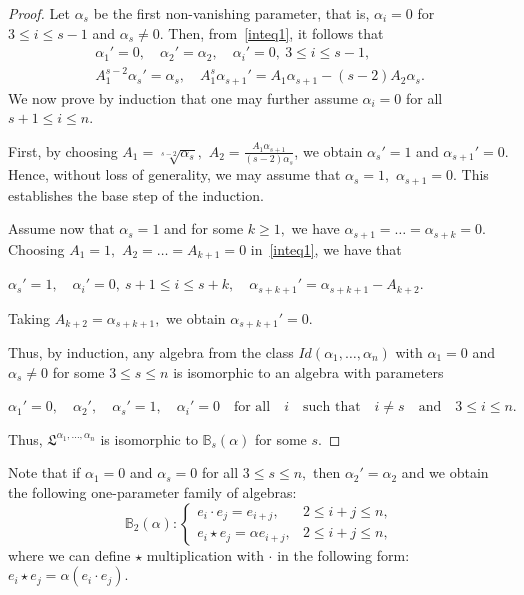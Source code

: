 \documentclass{jonasart}
\begin{document}
	\begin{proof}
		Let $\alpha_s$ be the first non-vanishing parameter, that is, $\alpha_{i}=0$ for $3 \leq i \leq s-1$ and $\alpha_s\neq 0$. Then, from~\eqref{inteq1}, it follows that
		\begin{gather*}
			\alpha_{1}'=0, \quad
            \alpha_2 '=\alpha_2, \quad
            \alpha_{i}'=0, \ 3 \leq i \leq s-1, \\
            A_1^{s-2}\alpha_{s}'=\alpha_{s}, \quad A_1^{s}\alpha_{s+1}'=A_1\alpha_{s+1} - (s-2) A_2\alpha_s.
		\end{gather*}
		We now prove by induction that one may further assume $\alpha_i =0$ for all $s+1 \leq i \leq n.$

		First, by choosing $A_1 = \sqrt[s-2]{\alpha_s},$ $A_2 = \frac{A_1\alpha_{s+1}}{(s-2)\alpha_s}$, we obtain $\alpha_s '=1$ and $\alpha_{s+1}'=0.$ Hence, without loss of generality, we may assume that $\alpha_s =1,$ $\alpha_{s+1}=0.$ This establishes the base step of the induction.

		Assume now that $\alpha_{s}=1$ and for some $k \ge 1,$ we have $\alpha_{s+1}= \dots= \alpha_{s+k}=0.$ Choosing $A_1 = 1,$ $A_2 =\dots=A_{k+1}=0$
		in~\eqref{inteq1}, we have that
		\begin{center}
			$\alpha_s '=1, \quad \alpha_i '=0, \ s+1 \leq i \leq s+k, \quad \alpha_{s+k+1}'=\alpha_{s+k+1} - A_{k+2}.$
		\end{center}
		Taking $A_{k+2}=\alpha_{s+k+1},$ we obtain $\alpha_{s+k+1}'=0.$

		Thus, by induction, any algebra from the class $Id(\alpha_1,\dots,\alpha_n )$ with $\alpha_1 =0$ and $\alpha_s \neq 0$ for some $ 3 \le s \le n$ is isomorphic to an algebra with parameters
		\begin{center}
			$\alpha_{1}'=0,\quad \alpha_2 ',\quad \alpha_s '=1, \quad \alpha_i ' = 0 \quad \text{for all}\quad i \quad\text{such that} \quad i\neq s\quad \text{and}\quad 3 \le i \le n.$
		\end{center}
		Thus, $\mathfrak{L}^{\alpha_1,\dots,\alpha_n}$ is isomorphic to $\mathbb{B}_s (\alpha)$ for some $s.$
	\end{proof}

	Note that if $\alpha_1 =0$ and $\alpha_s = 0$ for all $3 \le s \le n,$ then $\alpha_2 '=\alpha_2$ and we obtain the following one-parameter family of algebras:
	\[
		\mathbb{B}_2 (\alpha):
		\left\{
		\begin{array}{ll}
			e_i \cdot e_j =e_{i+j}, & 2\leq i+j \leq n, \\[1mm]
			e_i \star e_j = \alpha e_{i+j}, & 2\leq i+j \leq n,
		\end{array}
		\right.
	\]
	where we can define $\star$ multiplication with $\cdot$ in the following form: $e_i \star e_j = \alpha (e_i \cdot e_j ).$
\end{document}
